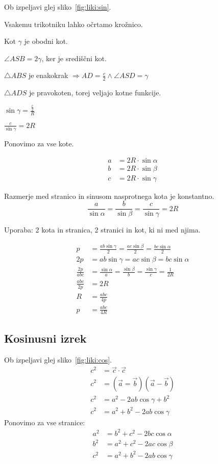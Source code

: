 \documentclass[a4paper,oneside,12pt,fleqn]{article}
\newcommand\krat\cdot
\def\kos{\cos}
\renewcommand\implies\Rightarrow
\numberwithin{equation}{section}
\newenvironment{enumerate*}%
{
\vspace{-12pt}%
\begin{enumerate}%
\setlength{\itemsep}{0pt}%
\setlength{\parskip}{2pt}}%
{\end{enumerate}}
\begin{document}
Ob izpeljavi glej sliko~\ref{fig:liki:sin}.
\begin{enumerate*}
  \item Vsakemu trikotniku lahko očrtamo krožnico.
  \item Kot $\gamma$ je obodni kot.
  \item $\angle ASB = 2\gamma$, ker je središčni kot.
  \item $\triangle ABS$ je enakokrak $\implies AD = \frac{c}{2} \land \angle ASD = \gamma$
  \item $\triangle ADS$ je pravokoten, torej veljajo kotne funkcije.
  \item $\sin\gamma = \frac{\frac{c}{2}}{R}$
  \item $\frac{c}{\sin\gamma} = 2R$
  \item Ponovimo za vse kote.
\end{enumerate*}
\begin{align*}
  a &= 2R \krat\sin\alpha \\
  b &= 2R \krat\sin\beta  \\
  c &= 2R \krat\sin\gamma
\end{align*}

Razmerje med stranico in sinusom nasprotnega kota je konstantno.
\[ \frac{a}{\sin\alpha} = \frac{b}{\sin\beta} = \frac{c}{\sin\gamma} = 2R \]

Uporaba: 2 kota in stranica, 2 stranici in kot, ki ni med njima.

\begin{align*}
  p &= \frac{ab\sin\gamma}{2} = \frac{ac\sin\beta}{2} = \frac{bc\sin\alpha}{2} \\
  2p &=  ab\sin\gamma = ac\sin\beta = bc\sin\alpha \\
  \frac{2p}{abc} &= \frac{\sin\alpha}{a} = \frac{\sin\beta}{b} = \frac{\sin\gamma}{c} =
  \frac{1}{2R} \\
  \frac{abc}{2p} &= 2R \\
  R &= \frac{abc}{4p} \\
  p &= \frac{abc}{4R}
\end{align*}

\subsection{Kosinusni izrek}
\label{sec:liki:cos}
Ob izpeljavi glej sliko~\ref{fig:liki:cos}.
\begin{align*}
  c^2 &= \vec{c}\krat\vec{c} \\
  c^2 &= (\vec{a} = \vec{b})(\vec{a} - \vec{b}) \\
  c^2 &= a^2 - 2ab\kos\gamma + b^2 \\
  c^2 &= a^2 + b^2 - 2ab\kos\gamma
\end{align*}
Ponovimo za vse stranice:
\begin{align}
  a^2 &= b^2 + c^2 - 2bc\kos\alpha \nonumber\\
  b^2 &= a^2 + c^2 - 2ac\kos\beta \nonumber \\
  c^2 &= a^2 + b^2 - 2ab\kos\gamma \label{eq:liki:cos}
\end{align}
\end{document}
